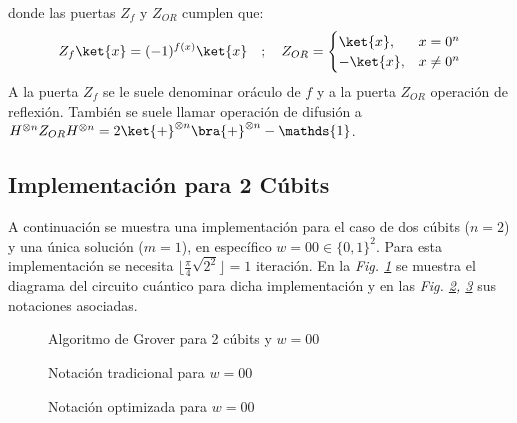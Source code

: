 \documentclass[10pt,conference,a4paper]{IEEEtran}
\begin{document}
\noindent donde las puertas $Z_f$ y $Z_{OR}$ cumplen que:
$$Z_f\ket{x}=(-1)^{f(x)}\ket{x}\quad ; \quad Z_{OR}=\begin{cases}
    \ket{x}, & x=0^n\\
    -\ket{x}, & x\neq 0^n
\end{cases}$$
A la puerta $Z_f$ se le suele denominar oráculo de $f$ y a la puerta $Z_{OR}$ operación de reflexión. También se suele llamar operación de difusión a $H^{\otimes n}Z_{OR}H^{\otimes n}=2\ket{+}^{\otimes n}\bra{+}^{\otimes n}-\mathds{1}$.
\subsection{Implementación para 2 Cúbits}
A continuación se muestra una implementación para el caso de dos cúbits ($n=2$) y una única solución ($m=1$), en específico $w=00\in\{0,1\}^2$. Para esta implementación se necesita $\lfloor\frac{\pi}{4}\sqrt{2^2}\rfloor=1$ iteración. En la \textit{Fig. \ref{fig:grover-2}} se muestra el diagrama del circuito cuántico para dicha implementación y en las \textit{Fig. \ref{not:grovertrad-2}, \ref{not:groveropt-2}} sus notaciones asociadas.

\begin{figure}[htb!]
\begin{center}
    \caption{Algoritmo de Grover para 2 cúbits y $w=00$} \label{fig:grover-2}
\end{center}
\end{figure}
\vspace{-5mm}
\begin{figure}[htb!]
\centering
{}
\caption{Notación tradicional para $w=00$}
\label{not:grovertrad-2}
\end{figure}
\vspace{-5mm}
\begin{figure}[htb!]
\centering
{}
\caption{Notación optimizada para $w=00$}
\label{not:groveropt-2}
\end{figure}
\end{document}
